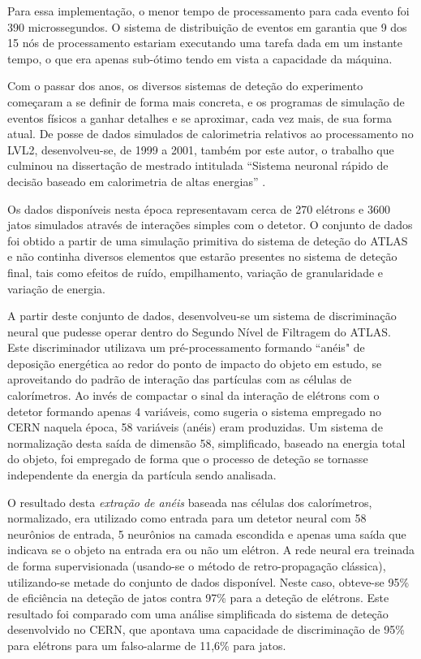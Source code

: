 Para essa implementação, o menor tempo de processamento para cada evento foi
390 microssegundos. O sistema de distribuição de eventos em
 garantia que 9 dos 15 nós de processamento estariam
executando uma tarefa dada em um instante tempo, o que era apenas sub-ótimo
tendo em vista a capacidade da máquina.

Com o passar dos anos, os diversos sistemas de deteção do experimento
começaram a se definir de forma mais concreta, e os programas de simulação de
eventos físicos a ganhar detalhes e se aproximar, cada vez mais, de sua forma
atual. De posse de dados simulados de calorimetria relativos ao processamento
no LVL2, desenvolveu-se, de 1999 a 2001, também por este autor, o trabalho que
culminou na dissertação de mestrado intitulada ``Sistema neuronal rápido de
decisão baseado em calorimetria de altas energias'' \cite{aa:msc-thesis}.

Os dados disponíveis nesta época representavam cerca de 270 elétrons e 3600
jatos simulados através de interações simples com o detetor. O conjunto de
dados foi obtido a partir de uma simulação primitiva do sistema de deteção do
ATLAS e não continha diversos elementos que estarão presentes no sistema
de deteção final, tais como efeitos de ruído, empilhamento, variação de
granularidade e variação de energia.

A partir deste conjunto de dados, desenvolveu-se um sistema de discriminação
neural que pudesse operar dentro do Segundo Nível de Filtragem do ATLAS. Este
discriminador utilizava um pré-processamento formando ``anéis" de deposição
energética ao redor do ponto de impacto do objeto em estudo, se aproveitando
do padrão de interação das partículas com as células de calorímetros. Ao invés
de compactar o sinal da interação de elétrons com o detetor formando apenas 4
variáveis, como sugeria o sistema empregado no CERN naquela época, 58
variáveis (anéis) eram produzidas. Um sistema de normalização desta saída de
dimensão 58, simplificado, baseado na energia total do objeto, foi empregado
de forma que o processo de deteção se tornasse independente da energia da
partícula sendo analisada.

O resultado desta \textit{extração de anéis} baseada nas células dos
calorímetros, normalizado, era utilizado como entrada para um detetor neural
com 58 neurônios de entrada, 5 neurônios na camada escondida e apenas uma
saída que indicava se o objeto na entrada era ou não um elétron. A rede neural
era treinada de forma supervisionada (usando-se o método de retro-propagação
clássica), utilizando-se metade do conjunto de dados disponível. Neste caso,
obteve-se 95\% de eficiência na deteção de jatos contra 97\% para a deteção de
elétrons. Este resultado foi comparado com uma análise simplificada do sistema
de deteção desenvolvido no CERN, que apontava uma capacidade de discriminação
de 95\% para elétrons para um falso-alarme de 11,6\% para jatos.

